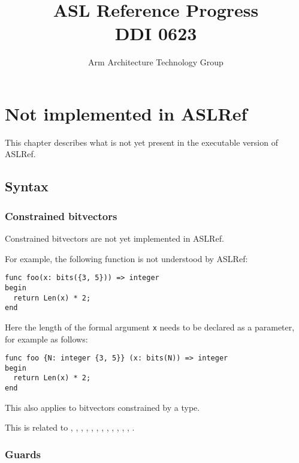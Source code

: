 \documentclass{book}
\author{Arm Architecture Technology Group}
\title{ASL Reference Progress \\
       DDI 0623}
\begin{document}
\maketitle

\tableofcontents{}





\chapter{Not implemented in ASLRef}

This chapter describes what is not yet present in the executable version of ASLRef.

\section{Syntax}

\subsection{Constrained bitvectors}

Constrained bitvectors are not yet implemented in ASLRef.

For example, the following function is not understood by ASLRef:
\begin{Verbatim}
func foo(x: bits({3, 5})) => integer
begin
  return Len(x) * 2;
end
\end{Verbatim}
%
Here the length of the formal argument \Verb|x| needs to be declared as a
parameter, for example as follows:
\begin{Verbatim}
func foo {N: integer {3, 5}} (x: bits(N)) => integer
begin
  return Len(x) * 2;
end
\end{Verbatim}
%
This also applies to bitvectors constrained by a type.

This is related to , , , ,
, , , , ,
, , , .

\subsection{Guards}
\end{document}
